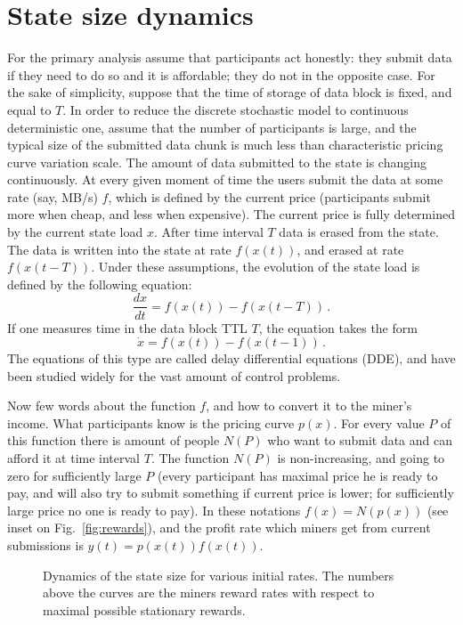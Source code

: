 \documentclass[]{llncs}   %
\begin{document}
\section{State size dynamics}
For the primary analysis assume that participants act honestly: they submit
data if they need to do so and it is affordable; they do not in the opposite
case. For the sake of simplicity, suppose that the time of storage of data
block is fixed, and equal to $T$. In order to reduce the discrete stochastic
model to continuous deterministic one, assume that the number of participants
is large, and the typical size of the submitted data chunk is much less than
characteristic pricing curve variation scale. The amount of data submitted to
the state is changing continuously. At every given moment of time the users
submit the data at some rate (say, MB/s) $f$, which is defined by the current
price (participants submit more when cheap, and less when expensive). The
current price is fully determined by the current state load $x$. After time
interval $T$ data is erased from the state. The data is written into the state
at rate $f(x(t))$, and erased at rate $f(x(t-T))$. Under these assumptions,
the evolution of the state load is defined by the following equation:
\begin{equation}
    \frac{dx}{dt} = f(x(t))-f(x(t-T))\,.
    \label{eq:dde0}
\end{equation}
If one measures time in the data block TTL $T$, the equation takes the form
\begin{equation}
    \dot{x} = f(x(t))-f(x(t-1))\,.
    \label{eq:dde1}
\end{equation}
The equations of this type are called delay differential equations (DDE), and have
been studied widely for the vast amount of control problems.

Now few words about the function $f$, and how to convert it to the miner's
income. What participants know is the pricing curve $p(x)$. For every value $P$
of this function there is amount of people $N(P)$ who want to submit data and
can afford it at time interval $T$. The function $N(P)$ is non-increasing, and
going to zero for sufficiently large $P$ (every participant has maximal price he
is ready to pay, and will also try to submit something if current price is
lower; for sufficiently large price no one is ready to pay). In these notations
$f(x)=N(p(x))$ (see inset on Fig.~\ref{fig:rewards}), and the profit rate which
miners get from current submissions is $y(t) = p(x(t))f(x(t))$.
\begin{figure}
    
    \caption{
        \label{fig:dynamics} Dynamics of the state size for various initial
        rates. The numbers above the curves are the miners reward rates with
        respect to maximal possible stationary rewards.
    }
\end{figure}
\end{document}

